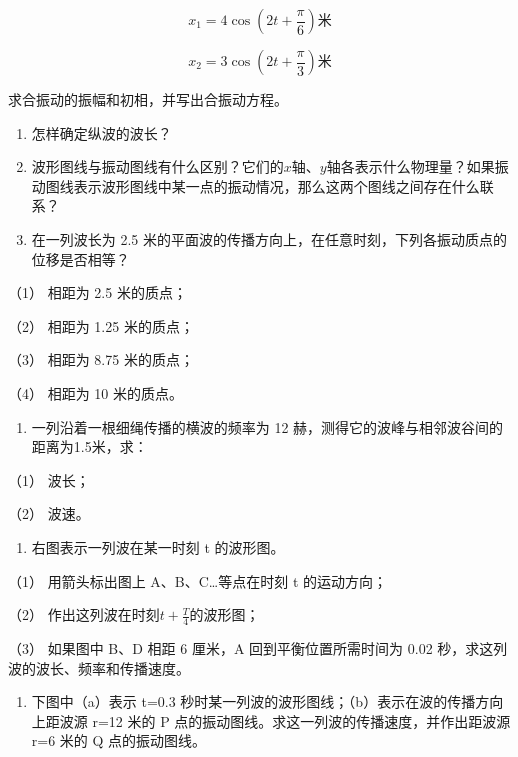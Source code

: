 \[
x _ {1} = 4 \cos \left(2 t + \frac {\pi}{6}\right) \text{米}
\]

\[
x _ {2} = 3 \cos \left(2 t + \frac {\pi}{3}\right) \text{米}
\]

求合振动的振幅和初相，并写出合振动方程。

\begin{enumerate}
\def\labelenumi{\arabic{enumi}.}
\setcounter{enumi}{9}
\item
  怎样确定纵波的波长？
\item
  波形图线与振动图线有什么区别？它们的\(x\)轴、\(y\)轴各表示什么物理量？如果振动图线表示波形图线中某一点的振动情况，那么这两个图线之间存在什么联系？
\item
  在一列波长为 2.5
  米的平面波的传播方向上，在任意时刻，下列各振动质点的位移是否相等？
\end{enumerate}

（1） 相距为 2.5 米的质点；

（2） 相距为 1.25 米的质点；

（3） 相距为 8.75 米的质点；

（4） 相距为 10 米的质点。

\begin{enumerate}
\def\labelenumi{\arabic{enumi}.}
\setcounter{enumi}{12}
\tightlist
\item
  一列沿着一根细绳传播的横波的频率为 12
  赫，测得它的波峰与相邻波谷间的距离为1.5米，求：
\end{enumerate}

（1） 波长；

（2） 波速。

\begin{enumerate}
\def\labelenumi{\arabic{enumi}.}
\setcounter{enumi}{13}
\tightlist
\item
  右图表示一列波在某一时刻 t 的波形图。
\end{enumerate}

（1） 用箭头标出图上 A、B、C\ldots 等点在时刻 t 的运动方向；

（2） 作出这列波在时刻\(t + \frac{T}{4}\)的波形图；

（3） 如果图中 B、D 相距 6 厘米，A 回到平衡位置所需时间为 0.02
秒，求这列波的波长、频率和传播速度。

\begin{enumerate}
\def\labelenumi{\arabic{enumi}.}
\setcounter{enumi}{14}
\tightlist
\item
  下图中（a）表示 t=0.3
  秒时某一列波的波形图线；（b）表示在波的传播方向上距波源 r=12 米的 P
  点的振动图线。求这一列波的传播速度，并作出距波源 r=6 米的 Q
  点的振动图线。
\end{enumerate}

